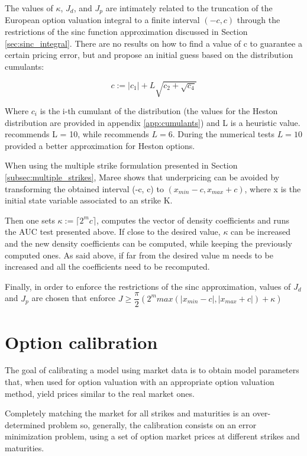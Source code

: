 \documentclass[12,twoside]{mammeTFM}
\theoremstyle{definition}
\theoremstyle{remark}
\begin{document}
The values of $\kappa$, $J_d$, and $J_p$ are intimately related to the truncation of the European option valuation integral to a finite interval $(-c, c)$ through the restrictions of the sinc function approximation discussed in Section \ref{sec:sinc_integral}. There are no results on how to find a value of c to guarantee a certain pricing error, but \cite{Ortiz-Gracia2016} and \cite{cui17} propose an initial guess based on the distribution cumulants:

\begin{equation}
c := |c_1| + L \sqrt{c_2 + \sqrt{c_4}}
\end{equation}

Where $c_i$ is the i-th cumulant of the distribution (the values for the Heston distribution are provided in appendix \ref{app:cumulants}) and L is a heuristic value. \cite{Ortiz-Gracia2016} recommends L = 10, while \cite{mar17} recommends $L = 6$. During the numerical tests $L = 10$ provided a better approximation for Heston options.

When using the multiple strike formulation presented in Section \ref{subsec:multiple_strikes}, Maree shows that underpricing can be avoided by transforming the obtained interval (-c, c) to $(x_{min} - c, x_{max} + c)$, where x is the initial state variable associated to an strike K.

Then one sets $\kappa := \lceil 2^m c \rceil$, computes the vector of density coefficients and runs the AUC test presented above. If close to the desired value, $\kappa$ can be increased and the new density coefficients can be computed, while keeping the previously computed ones. As said above, if far from the desired value m needs to be increased and all the coefficients need to be recomputed.

Finally, in order to enforce the restrictions of the sinc approximation, values of $J_d$ and $J_p$ are chosen that enforce $J \geq \dfrac{\pi}{2}(2^m max(|x_{min} - c|, |x_{max} + c|) + \kappa)$

\section{Option calibration} \label{chap:optimization_problem}
The goal of calibrating a model using market data is to obtain model parameters that, when used for option valuation with an appropriate option valuation method, yield prices similar to the real market ones.

Completely matching the market for all strikes and maturities is an over-determined problem so, generally, the calibration consists on an error minimization problem, using a set of option market prices at different strikes and maturities.
\end{document}
